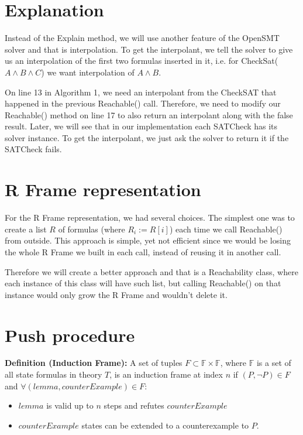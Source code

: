 \section*{Explanation}
\noindent Instead of the Explain method, we will use another feature of the OpenSMT solver and that is interpolation. To get the interpolant, we tell the solver to give us an interpolation of the first two formulas inserted in it, i.e. for CheckSat($A \wedge B \wedge C$) we want interpolation of $A \wedge B$. 


On line 13 in Algorithm 1, we need an interpolant from the CheckSAT that happened in the previous Reachable() call. Therefore, we need to modify our Reachable() method on line 17 to also return an interpolant along with the false result. Later, we will see that in our implementation each SATCheck has its solver instance. To get the interpolant, we just ask the solver to return it if the SATCheck fails.

\section*{R Frame representation}
\noindent For the R Frame representation, we had several choices. The simplest one was to create a list $R$ of formulas (where $R_i := R[i]$) each time we call Reachable() from outside. This approach is simple, yet not efficient since we would be losing the whole R Frame we built in each call, instead of reusing it in another call. 

Therefore we will create a better approach and that is a Reachability class, where each instance of this class will have such list, but calling Reachable() on that instance would only grow the R Frame and wouldn't delete it.

\section{Push procedure}

\noindent \textbf{Definition (Induction Frame):} A set of tuples $F \subset \mathbb{F} \times \mathbb{F}$, where $\mathbb{F}$ is a set of all state formulas in theory $T$, is an induction frame at index $n$ if $(P, \neg P) \in F$ and $\forall (lemma, counterExample) \in F$:
\begin{itemize}
    \item $lemma$ is valid up to $n$ steps and refutes $counterExample$
    \item $counterExample$ states can be extended to a counterexample to $P$.
\end{itemize}


